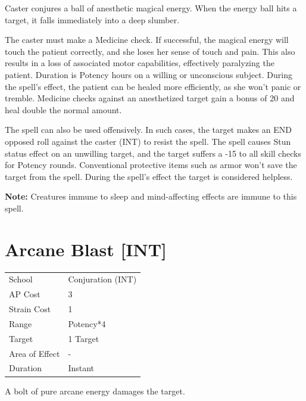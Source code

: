 \documentclass[11pt,a4paper,twocolumn]{book}
\begin{document}
\medskip

Caster conjures a ball of anesthetic magical energy. When the energy ball hits a target, it falls immediately into a deep slumber.

The caster must make a Medicine check. If successful, the magical energy will touch the patient correctly, and she loses her sense of touch and pain. This also results in a loss of associated motor capabilities, effectively paralyzing the patient. Duration is Potency hours on a willing or unconscious subject. During the spell's effect, the patient can be healed more efficiently, as she won't panic or tremble. Medicine checks against an anesthetized target gain a bonus of 20 and heal double the normal amount.

The spell can also be used offensively. In such cases, the target makes an END opposed roll against the caster (INT) to resist the spell. The spell causes Stun status effect on an unwilling target, and the target suffers a -15 to all skill checks for Potency rounds. Conventional protective items such as armor won't save the target from the spell. During the spell's effect the target is considered helpless.

\textbf{Note:} Creatures immune to sleep and mind-affecting effects are immune to this spell.

\vfill


\section*{Arcane Blast [INT]}
{
	\begin{tabu} to 75mm{| X[l,4] | X[l,7] |}
		\hline
		School 			& Conjuration (INT) \\
        AP Cost	      	& 3 				\\
        Strain Cost     & 1 				\\
        Range     		& Potency*4 		\\
        Target      	& 1 Target 			\\
        Area of Effect  & - 	 			\\
        Duration     	& Instant 			\\ \hline
	\end{tabu}
		
}

\medskip

A bolt of pure arcane energy damages the target.
 
\end{document}
